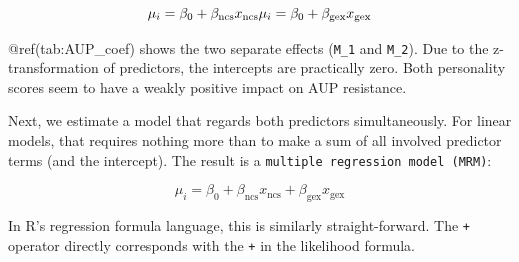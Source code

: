 \documentclass[]{svmono}
\newenvironment{Shaded}{\begin{snugshade}}{\end{snugshade}}
\newcommand{\KeywordTok}[1]{\textcolor[rgb]{0.13,0.29,0.53}{\textbf{#1}}}
\newcommand{\DataTypeTok}[1]{\textcolor[rgb]{0.13,0.29,0.53}{#1}}
\newcommand{\DecValTok}[1]{\textcolor[rgb]{0.00,0.00,0.81}{#1}}
\newcommand{\StringTok}[1]{\textcolor[rgb]{0.31,0.60,0.02}{#1}}
\newcommand{\CommentTok}[1]{\textcolor[rgb]{0.56,0.35,0.01}{\textit{#1}}}
\newcommand{\OperatorTok}[1]{\textcolor[rgb]{0.81,0.36,0.00}{\textbf{#1}}}
\newcommand{\NormalTok}[1]{#1}
\begin{document}
\[
\mu_i = \beta_0 + \beta_\mathrm{ncs} x_\mathrm{ncs}\\
\mu_i = \beta_0 + \beta_\mathrm{gex} x_\mathrm{gex}
\]

\begin{Shaded}
\end{Shaded}

@ref(tab:AUP\_coef) shows the two separate effects (\texttt{M\_1} and
\texttt{M\_2}). Due to the z-transformation of predictors, the
intercepts are practically zero. Both personality scores seem to have a
weakly positive impact on AUP resistance.

Next, we estimate a model that regards both predictors simultaneously.
For linear models, that requires nothing more than to make a sum of all
involved predictor terms (and the intercept). The result is a
\texttt{multiple\ regression\ model\ (MRM)}:

\[
\mu_i = \beta_0 + \beta_\mathrm{ncs} x_\mathrm{ncs} + \beta_\mathrm{gex} x_\mathrm{gex}
\]

In R's regression formula language, this is similarly straight-forward.
The \texttt{+} operator directly corresponds with the \texttt{+} in the
likelihood formula.

\begin{Shaded}
\end{Shaded}
\end{document}
